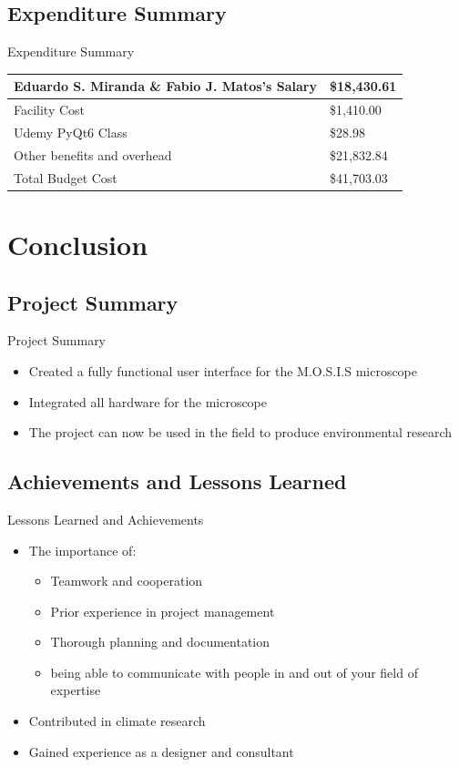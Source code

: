 \documentclass[17pt, aspectratio=169]{beamer}
\begin{document}
\subsection*{Expenditure Summary}
\begin{frame}{Expenditure Summary}
	\begin{center}
		\begin{tabular}{||m{} | m{} ||}
			\hline
			Eduardo S. Miranda \& Fabio J. Matos's Salary & \$18,430.61 \\
			\hline
			Facility Cost                                 & \$1,410.00  \\
			\hline
			Udemy PyQt6 Class                             & \$28.98     \\
			\hline
			Other benefits and overhead                   & \$21,832.84 \\
			\hline
			Total Budget Cost                             & \$41,703.03 \\
			\hline
		\end{tabular}
	\end{center}
\end{frame}
\section{Conclusion}
\subsection{Project Summary}
\begin{frame}{Project Summary}
	\begin{itemize}
		\item Created a fully functional user interface for the M.O.S.I.S microscope
		\item Integrated all hardware for the microscope
		\item The project can now be used in the field to produce environmental research
	\end{itemize}
\end{frame}
\subsection{Achievements and Lessons Learned}
\begin{frame}{Lessons Learned and Achievements}
	\begin{itemize}
		\item The importance of:
		      \begin{itemize}
			      \item Teamwork and cooperation
			      \item Prior experience in project management
			      \item Thorough planning and documentation
			      \item being able to communicate with people in and out of your field of expertise
		      \end{itemize}
		\item Contributed in climate research
		\item Gained experience as a designer and consultant
	\end{itemize}
\end{frame}
\end{document}
